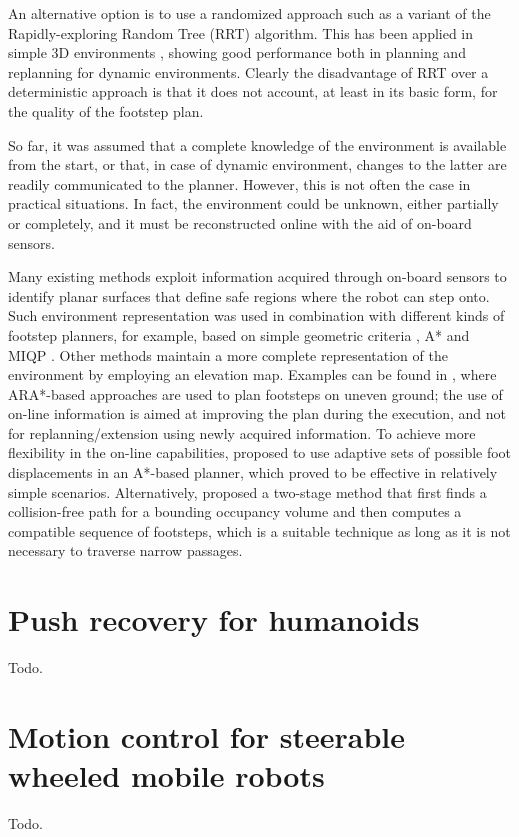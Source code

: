An alternative option is to use a randomized approach such as a variant of the Rapidly-exploring Random Tree (RRT) algorithm. 
This has been applied in simple 3D environments \cite{Liu_IROS2012}, showing good performance both in planning and replanning for dynamic environments. Clearly the disadvantage of RRT over a deterministic approach is that it does not account, at least in its basic form, for the quality of the footstep plan.

So far, it was assumed that a complete knowledge of the environment is available from the start, or that, in case of dynamic environment, changes to the latter are readily communicated to the planner. However, this is not often the case in practical situations. In fact, the environment could be unknown, either partially or completely, and it must be reconstructed online with the aid of on-board sensors.

Many existing methods exploit information acquired through on-board sensors to identify planar surfaces that define safe regions where the robot can step onto.
Such environment representation was used in combination with different kinds of footstep planners, for example, based on simple geometric criteria \cite{Okada_ICRA2005}, A* \cite{Chestnutt_IROS2009} and MIQP \cite{Fallon_HUM2015}.   
Other methods maintain a more complete representation of the environment by employing an elevation map.
Examples can be found in \cite{Maier_IROS2013, Stumpf_HUM2014}, where ARA*-based approaches are used to plan footsteps on uneven ground; the use of on-line information is aimed at improving the plan during the execution, and not for replanning/extension using newly acquired information.
To achieve more flexibility in the on-line capabilities, \cite{Karkowski_HUM2016} proposed to use adaptive sets of possible foot displacements in an A*-based planner, which proved to be effective in relatively simple scenarios. Alternatively, \cite{Yamamoto_AdvR2021} proposed a two-stage method that first finds a collision-free path for a bounding occupancy volume and then computes a compatible sequence of footsteps, which is a suitable technique as long as it is not necessary to traverse narrow passages.


\section{Push recovery for humanoids}
Todo.

\section{Motion control for steerable wheeled mobile robots}
Todo.
